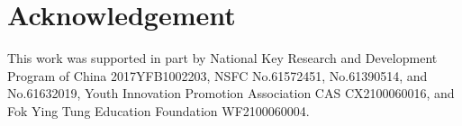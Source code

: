 \documentclass[runningheads]{llncs}
\begin{document}
\section*{Acknowledgement}

This work was supported in part by National Key Research and Development Program of China 2017YFB1002203, NSFC No.61572451, No.61390514, and No.61632019, Youth Innovation Promotion Association CAS CX2100060016, and Fok Ying Tung Education Foundation WF2100060004.
\clearpage



\end{document}

